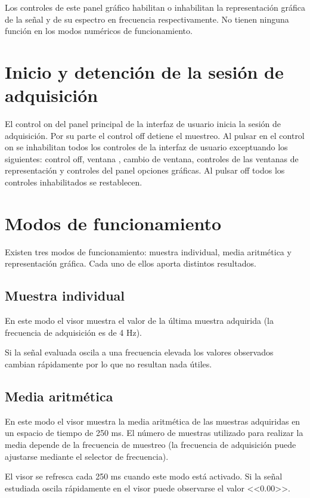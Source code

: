 Los controles de este panel gráfico habilitan o inhabilitan la
representación gráfica de la señal y de su espectro en frecuencia
respectivamente. No tienen ninguna función en los modos numéricos de
funcionamiento.


\section{Inicio y detención de la sesión de adquisición}

El control on del panel principal de la interfaz de usuario inicia la
sesión de adquisición. Por su parte el control off detiene el muestreo. Al
pulsar en el control on se inhabilitan todos los controles de la interfaz
de usuario exceptuando los siguientes: control off, ventana ,
cambio de ventana, controles de las ventanas de representación y controles
del panel opciones gráficas. Al pulsar off todos los controles
inhabilitados se restablecen.


\section{Modos de funcionamiento}

Existen tres modos de funcionamiento: muestra individual, media aritmética
y representación gráfica. Cada uno de ellos aporta distintos resultados.


\subsection{Muestra individual}

En este modo el visor muestra el valor de la última muestra adquirida (la
frecuencia de adquisición es de 4 Hz).

Si la señal evaluada oscila a una frecuencia elevada los valores observados
cambian rápidamente por lo que no resultan nada útiles.


\subsection{Media aritmética}

En este modo el visor muestra la media aritmética de las muestras
adquiridas en un espacio de tiempo de 250 ms. El número de muestras
utilizado para realizar la media depende de la frecuencia de muestreo (la
frecuencia de adquisición puede ajustarse mediante el selector de
frecuencia).

El visor se refresca cada 250 ms cuando este modo está activado. Si la
señal estudiada oscila rápidamente en el visor puede observarse el valor
<<$0.00$>>.


